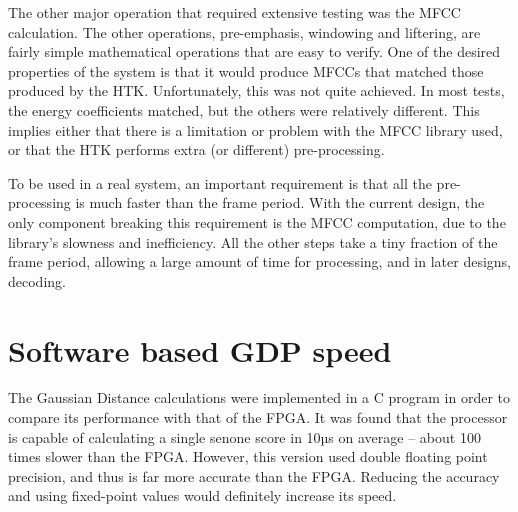 	The other major operation that required extensive testing was the MFCC calculation.  The other operations, pre-emphasis, windowing and liftering, are fairly simple mathematical operations that are easy to verify.  One of the desired properties of the system is that it would produce MFCCs that matched those produced by the HTK. Unfortunately, this was not quite achieved.  In most tests, the energy coefficients matched, but the others were relatively different.  This implies either that there is a limitation or problem with the MFCC library used, or that the HTK performs extra (or different) pre-processing.

	To be used in a real system, an important requirement is that all the pre-processing is much faster than the frame period.  With the current design, the only component breaking this requirement is the MFCC computation, due to the library's slowness and inefficiency.  All the other steps take a tiny fraction of the frame period, allowing a large amount of time for processing, and in later designs, decoding.

\section{Software based GDP speed} %
\label{sec:software_based_gdp_speed_testing}
	The Gaussian Distance calculations were implemented in a C program in order to compare its performance with that of the FPGA.  It was found that the processor is capable of calculating a single senone score in 10µs on average -- about 100 times slower than the FPGA.  However, this version used double floating point precision, and thus is far more accurate than the FPGA.  Reducing the accuracy and using fixed-point values would definitely increase its speed.





